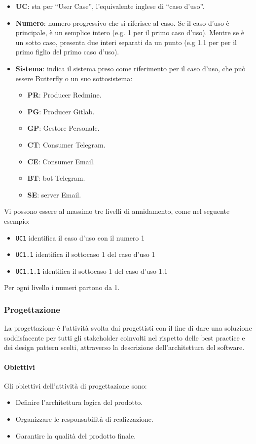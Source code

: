 		\begin{itemize}
			\item \textbf{UC}: sta per ``User Case'', l'equivalente inglese di ``caso d'uso''.
			\item \textbf{Numero}: numero progressivo che si riferisce al caso. Se il caso d'uso è principale, è un semplice intero (e.g. 1 per il primo caso d'uso). Mentre se è un sotto caso, presenta due interi separati da un punto (e.g 1.1 per per il primo figlio del primo caso d'uso).
			\item \textbf{Sistema}: indica il sistema preso come riferimento per il caso d'uso, che può essere Butterfly o un suo sottosistema:
			\begin{itemize}
				\item \textbf{PR}: Producer Redmine.
				\item \textbf{PG}: Producer Gitlab.
				\item \textbf{GP}: Gestore Personale.
				\item \textbf{CT}: Consumer Telegram.
				\item \textbf{CE}: Consumer Email.
				\item \textbf{BT}: bot Telegram.
				\item \textbf{SE}: server Email.
			\end{itemize}
		\end{itemize}

		Vi possono essere al massimo tre livelli di annidamento, come nel seguente esempio:
		\begin{itemize}
			\item \texttt{UC1} identifica il caso d'uso con il numero 1
			\item \texttt{UC1.1} identifica il sottocaso 1 del caso d'uso 1
			\item \texttt{UC1.1.1} identifica il sottocaso 1 del caso d'uso 1.1
		\end{itemize}
		Per ogni livello i numeri partono da 1.

        \subsubsection{Progettazione}\label{PP:Sviluppo:Progettazione}
        La progettazione è l'attività svolta dai progettisti con il fine di dare una soluzione soddisfacente per tutti gli stakeholder coinvolti nel rispetto delle best practice e dei design pattern scelti, attraverso la descrizione dell'architettura del software.

		\paragraph{Obiettivi}\label{PP:Sviluppo:Progettazione:Obiettivi}
        Gli obiettivi dell'attività di progettazione sono:
        \begin{itemize}
			\item Definire l'architettura logica del prodotto.
			\item Organizzare le responsabilità di realizzazione.
			\item Garantire la qualità del prodotto finale.
		\end{itemize}


